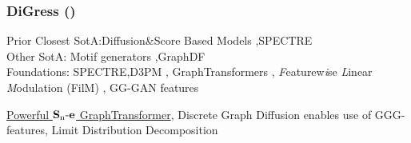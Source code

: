 \documentclass[./presentation.tex]{subfiles}
\begin{document}
\begin{frame}[t,label=digressintro]
  \frametitle{DiGress (\cite{vignacDiGressDiscreteDenoising2023b})}
  \vspace{-1cm}
\footnotesize
\begin{priorart}
{\footnotesize
    Prior Closest SotA:Diffusion\&Score Based Models \citep{niuPermutationInvariantGraph2020b,songGenerativeModelingEstimating2019b},SPECTRE \citep{martinkusSPECTRESpectralConditioning2022b}\\
    Other SotA: Motif generators \citep{maziarzLearningExtendMolecular2021},GraphDF\citep{luoGraphDFDiscreteFlow2021d}
\\
Foundations: SPECTRE,D3PM \citep{austinStructuredDenoisingDiffusion2021e}, GraphTransformers \citep{vaswaniAttentionAllYou2017c,yunGraphTransformerNetworks2019b}, \textit{F}eaturew\textit{i}se \textit{L}inear \textit{M}odulation (FilM) \citep{perezFiLMVisualReasoning2018b}, GG-GAN features
 }
  \end{priorart}
  \vspace{-0.25cm}
  \begin{contributions}
    \hyperlink{digressbackuparch}{Powerful $\operatorname{\mathbf{S}_n\mathbf{-e}}$ GraphTransformer}, Discrete Graph Diffusion enables use of GGG-features, Limit Distribution Decomposition
  \end{contributions}
%
  
\end{frame}
\end{document}
